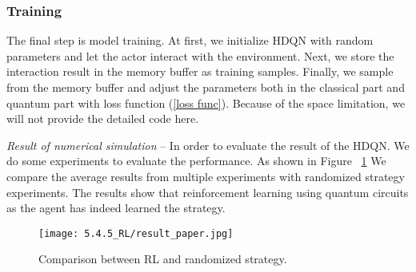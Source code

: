 \subsubsection{Training}The final step is model training. At first, we initialize HDQN with random parameters and let the actor interact with the environment. Next, we store the interaction result in the memory buffer as training samples. Finally, we sample from the memory buffer and adjust the parameters both in the classical part and quantum part with loss function (\ref{loss func}). Because of the space limitation, we will not provide the detailed code here.

\textit{Result of numerical simulation} -- In order to evaluate the result of the HDQN. We do some experiments to evaluate the performance. As shown in Figure ~\ref{stochastic} We compare the average results from multiple experiments with randomized strategy experiments. The results show that reinforcement learning using quantum circuits as the agent has indeed learned the strategy.
\begin{figure}[ht]
  \centering
  \texttt{[image: 5.4.5\_RL/result\_paper.jpg]}
  \caption{\label{stochastic} Comparison between RL and randomized strategy.}
\end{figure}
